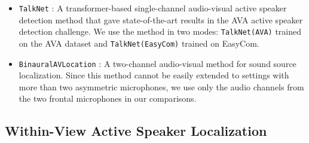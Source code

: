 \documentclass[10pt,twocolumn,letterpaper]{article}
\begin{document}
\begin{itemize}
\vspace{-8pt}		
\item \texttt{TalkNet} \cite{talknet}: A transformer-based single-channel audio-visual active speaker detection method 
	that gave 
	state-of-the-art
results in the AVA active speaker detection challenge. 
		We use the method in two modes: \texttt{TalkNet(AVA)} trained on the AVA dataset and \texttt{TalkNet(EasyCom)} 
		trained on EasyCom.
\vspace{-8pt}
	\item \texttt{BinauralAVLocation} \cite{wangaaai}: A two-channel audio-visual method for sound source localization. 
		Since this method cannot be easily extended to settings with more than two asymmetric microphones, we use only the audio channels from the 
		two frontal microphones in our comparisons.

\end{itemize}

\subsection{Within-View Active Speaker Localization}
\end{document}
